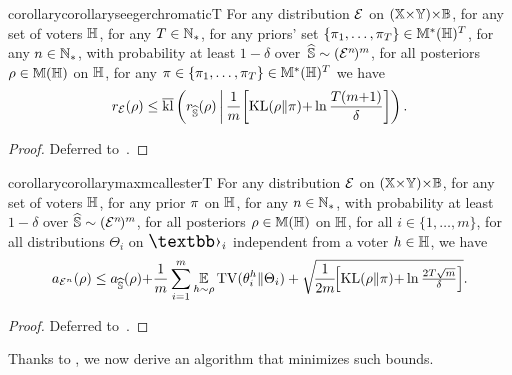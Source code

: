 \begin{restatable}{corollary}{corollaryseegerchromaticT}\label{chap:mv-robustness:corollary:seeger-chromatic-T} For any distribution $\Dpert$ on $(\X{\times}\Y){\times}\Xpert$, for any set of voters $\H$, for any $\iter\in\N_{*}$, for any priors' set $\{\P_1,\dots,\P_T\}\in\M^*(\H)^T$, for any $n\in\N_{*}$, with probability at least $1{-}\delta$ over~$\Spert\sim(\Dpert^{n\!})^\m$, for all posteriors  $\Q\in\M(\H)$ on $\H$, for any $\P\in\{\P_1,\dots,\P_T\}\in\M^*(\H)^T$ we have
\begin{align}
\RiskS_{\Dpert}(\Q) \le \klmax\LP\RiskS_{\Spert}(\Q) \,\middle|\, \frac{1}{\m}\!\LB\KL(\Q\|\P){+}\ln\frac{\iter(\m{+}1)}{\delta} \RB \RP.\label{chap:mv-robustness:eq:seeger-chromatic-T}
\end{align}
\end{restatable}
\begin{noaddcontents}\begin{proof}
Deferred to~.
\end{proof}\end{noaddcontents}

\begin{restatable}{corollary}{corollarymaxmcallesterT}\label{chap:mv-robustness:corollary:max-mcallester-T}
For any distribution $\Dpert$ on $(\X{\times}\Y){\times}\Xpert$, for any set of voters $\H$, for any prior  $\P$ on $\H$, for any $n\in\N_{*}$,  with probability at least $1{-}\delta$ over $\Spert\sim(\Dpert^{n\!})^\m$, for all posteriors $\Q\in\M(\H)$ on $\H$, for all $i\in\{1,\dots,m\}$, for all distributions $\Theta_i$ on $\Epert_i$ independent from a voter $\h\in\H$, we have
\begin{align}
    \RiskMS_{\Dpert^{n}}(\Q) \le \RiskMS_{\Spert}(\Q){+}\frac{1}{\m}\sum_{i=1}^{\m}\EE_{\h\sim\Q}\TV(\theta_i^\h\|\Theta_i) + \sqrt{\!\frac{1}{2\m}\!\!\LB\KL(\Q\|\P){+}\ln\tfrac{2T\sqrt{\m}}{\delta}\RB}.\label{chap:mv-robustness:eq:max-mcallester-T}
\end{align}
\end{restatable}
\begin{noaddcontents}\begin{proof}
Deferred to~.
\end{proof}\end{noaddcontents}

Thanks to , we now derive an algorithm that minimizes such bounds.

